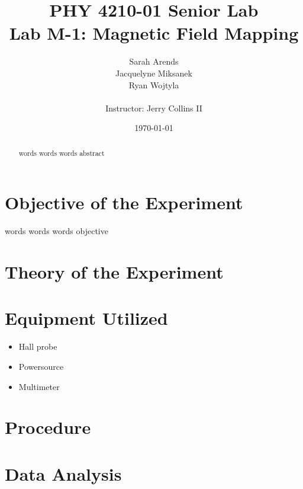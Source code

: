 \documentclass[a4paper]{article}
\title{PHY 4210-01 Senior Lab \\Lab M-1: Magnetic Field Mapping}
\author{Sarah Arends \\
        Jacquelyne Miksanek \\
        Ryan Wojtyla \\ \\
        Instructor: Jerry Collins II}
\date{\today}
\begin{document}
\maketitle

\begin{abstract}
\qq words words words abstract
\end{abstract}

\newpage

\tableofcontents

\newpage

\section{Objective of the Experiment}
\qq words words words objective

\section{Theory of the Experiment}

\section{Equipment Utilized}
\begin{itemize}
\item Hall probe
\item Powersource
\item Multimeter
\end{itemize}

\section{Procedure}


\section{Data Analysis}
\end{document}
